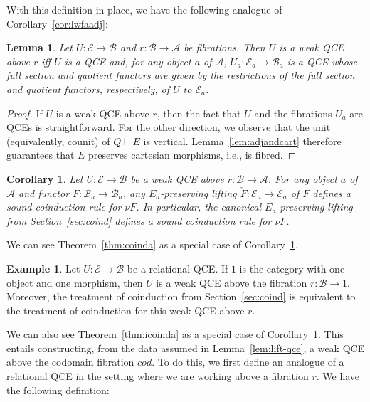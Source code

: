 \documentclass{LMCS}
\newcommand{\ra}{\rightarrow}
\newcommand{\cech}[1]{\check{#1}}
\newcommand\E{{\mathcal E}}
\newcommand\B{{\mathcal B}}
\newcommand\A{{\mathcal A}}
\theoremstyle{plain}
\newtheorem{corollary}[theorem]{Corollary}
\newtheorem{lemma}[theorem]{Lemma}
\theoremstyle{remark}
\theoremstyle{definition}
\newtheorem{example}[theorem]{Example}
\begin{document}
With this definition in place, we have the following analogue of
Corollary~\ref{cor:lwfaadj}: 

\begin{lemma}
Let $U:\E \ra \B$ and $r:\B \ra \A$ be fibrations. Then $U$ is a weak
QCE above $r$ iff $U$ is a QCE and, for any object $a$ of $\A$,
$U_a:\E_a \ra \B_a$ is a QCE whose full section and quotient functors
are given by the restrictions of the full section and quotient
functors, respectively, of $U$ to $\E_a$.
\end{lemma}

\begin{proof}
If $U$ is a weak QCE above $r$, then the fact that $U$ and the
fibrations $U_a$ are QCEs is straightforward. For the other direction,
we observe that the unit (equivalently, counit) of $Q \vdash E$ is
vertical. Lemma~\ref{lem:adjandcart} therefore guarantees that $E$
preserves cartesian morphisms, i.e., is fibred.
\end{proof}

\begin{corollary}\label{cor:icoind}
  Let $U:\E\to\B$ be a weak QCE above $r:\B\to\A$. For any object $a$
  of $\A$ and functor $F:\B_a\to\B_a$, any $E_a$-preserving lifting
  $\cech{F}:\E_a\to\E_a$ of $F$ defines a sound coinduction rule for
  $\nu F$. In particular, the canonical $E_a$-preserving lifting from
  Section~\ref{sec:coind} defines a sound coinduction rule for $\nu
  F$.
\end{corollary}

We can see Theorem~\ref{thm:coinda} as a special case of 
Corollary~\ref{cor:icoind}.

\begin{example}\label{ex:sec3}
  Let $U:\E \ra \B$ be a relational QCE. If $1$ is the category with
  one object and one morphism, then $U$ is a weak QCE above the
  fibration $r :\B \ra 1$. Moreover, the treatment of coinduction from
  Section~\ref{sec:coind} is equivalent to the treatment of
  coinduction for this weak QCE above $r$.
\end{example}

\noindent
We can also see Theorem~\ref{thm:icoinda} as a special case of
Corollary~\ref{cor:icoind}. This entails constructing, from the data
assumed in Lemma~\ref{lem:lift-qce}, a weak QCE above the codomain
fibration $\mathit{cod}$.  To do this, we first define an analogue of
a relational QCE in the setting where we are working above a fibration
$r$. We have the following definition:
\end{document}
